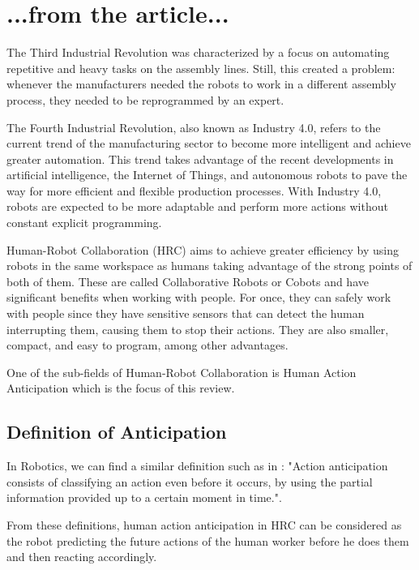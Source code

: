 {\color{red} 
\section{...from the article...}

The Third Industrial Revolution was characterized by a focus on automating repetitive and heavy tasks on the assembly lines. Still, this created a problem: whenever the manufacturers needed the robots to work in a different assembly process, they needed to be reprogrammed by an expert.

The Fourth Industrial Revolution, also known as Industry 4.0, refers to the current trend of the manufacturing sector to become more intelligent and achieve greater automation. This trend takes advantage of the recent developments in artificial intelligence, the Internet of Things, and autonomous robots to pave the way for more efficient and flexible production processes. With Industry 4.0, robots are expected to be more adaptable and perform more actions without constant explicit programming. 

Human-Robot Collaboration (HRC) aims to achieve greater efficiency by using robots in the same workspace as humans taking advantage of the strong points of both of them. These are called Collaborative Robots or Cobots and have significant benefits when working with people. For once, they can safely work with people since they have sensitive sensors that can detect the human interrupting them, causing them to stop their actions. They are also smaller, compact, and easy to program, among other advantages.\cite{CobotsWW}

One of the sub-fields of Human-Robot Collaboration is Human Action Anticipation which is the focus of this review.

\subsection{Definition of Anticipation}
 
 In Robotics, we can find a similar definition such as in \cite{Canuto2021}: "Action anticipation consists of classifying an action even before it occurs, by using the partial information provided up to a certain moment in time.".

 From these definitions, human action anticipation in HRC can be considered as the robot predicting the future actions of the human worker before he does them and then reacting accordingly.

}
